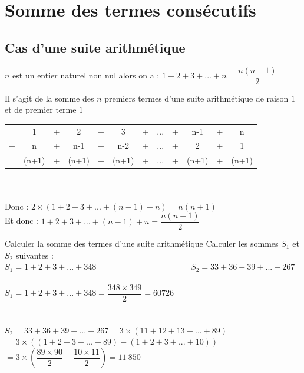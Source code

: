\section{Somme des termes consécutifs}

\subsection{Cas d'une suite arithmétique}

\begin{propriete}
$n$ est un entier naturel non nul alors on a : $1+2+3+...+n= \dfrac{n(n+1)}{2}$
\end{propriete}

\begin{remarque}
Il s'agit de la somme des $n$ premiers termes d'une suite arithmétique de raison $1$ et de premier terme $1$
\end{remarque}

\begin{demonstration}
    \begin{tabular}{ c c c c c c c c c c c c }			
         & 1 & + & 2 & + & 3 & + &... & + &n-1 & + & n \\
       + & n & + & n-1 & + & n-2 & + & ...& + & 2 & + & 1 \\
       \hline
         & (n+1) & + & (n+1) & + & (n+1) & + & ... & + & (n+1) & + & (n+1)\\
    \end{tabular} \\
    \\
    Donc : $2\times (1+2+3+...+(n-1)+n)=n(n+1)$\\
    Et donc : $1+2+3+...+(n-1)+n=\dfrac{n(n+1)}{2}$
\end{demonstration}

\begin{methodeTitre}{Calculer la somme des termes d'une suite arithmétique}
    Calculer les sommes $S_1$ et $S_2$ suivantes :\\ 
    $S_1=1+2+3+...+348$\ \ \ \ \ \ \ \ \ \ \ \ \ \ \ \ \ \ \ \ \ \ \ $S_2=33+36+39+...+267$
    \\
    \\
    $S_1=1+2+3+...+348=\dfrac{348\times 349}{2}=60726$\\
    \\
    \\
    $S_2=33+36+39+...+267=3\times(11+12+13+...+89)$\\
    $=3\times((1+2+3+...+89)-(1+2+3+...+10))$\\
    $=3\times \left(\dfrac{89\times 90}{2}-\dfrac{10\times11}{2}\right)=11\ 850$
\end{methodeTitre}

